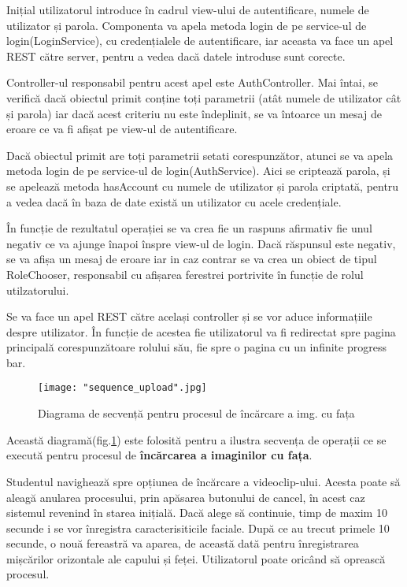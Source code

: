 \documentclass[a4paper, 12pt]{article}
\begin{document}
	\quad Inițial utilizatorul introduce în cadrul view-ului de autentificare, numele de utilizator și parola. Componenta va apela metoda login de pe service-ul de login(LoginService), cu credențialele de autentificare, iar aceasta va face un apel REST către server, pentru a vedea dacă datele introduse sunt corecte.
	
	\quad Controller-ul responsabil pentru acest apel este AuthController. Mai întai, se verifică dacă obiectul primit conține toți parametrii (atât numele de utilizator cât și parola) iar dacă acest criteriu nu este îndeplinit, se va întoarce un mesaj de eroare ce va fi afișat pe view-ul de autentificare.
	
	\quad Dacă obiectul primit are toți parametrii setati corespunzător, atunci se va apela metoda login de pe service-ul de login(AuthService). Aici se criptează parola, și se apelează metoda hasAccount cu numele de utilizator și parola criptată, pentru a vedea dacă în baza de date există un utilizator cu acele credențiale.
	
	\quad În funcție de rezultatul operației se va crea fie un raspuns afirmativ fie unul negativ ce va ajunge înapoi înspre view-ul de login. Dacă răspunsul este negativ, se va afișa un mesaj de eroare iar in caz contrar se va crea
	un obiect de tipul RoleChooser, responsabil cu afișarea ferestrei portrivite în funcție de rolul utilzatorului.
	
	\quad Se va face un apel REST către același controller și se vor aduce informațiile despre utilizator. În funcție de acestea fie utilizatorul va fi redirectat spre pagina principală corespunzătoare rolului său, fie spre o pagina cu un infinite progress bar.
	\bigskip
	\begin{figure}[H]
		\centering
		\texttt{[image: "sequence\_upload".jpg]}
		\caption{Diagrama de secvență pentru procesul de încărcare a img. cu fața}\label{fig:sequence_upload}
	\end{figure}
	
	\quad Această diagramă(fig.\ref{fig:sequence_upload}) este folosită pentru a ilustra secvența de operații ce se execută pentru procesul de \textbf{încărcarea a imaginilor cu fața}.
	
	\quad Studentul navighează spre opțiunea de încărcare a videoclip-ului. Acesta poate să aleagă anularea procesului, prin apăsarea butonului de cancel, în acest caz sistemul revenind în starea inițială. Dacă alege să continuie, timp de maxim 10 secunde i se vor înregistra caracterisiticile faciale. După ce au trecut primele 10 secunde, o nouă fereastră va aparea, de această dată pentru înregistrarea mișcărilor orizontale ale capului și feței. Utilizatorul poate oricând să oprească procesul.
	
\end{document}
